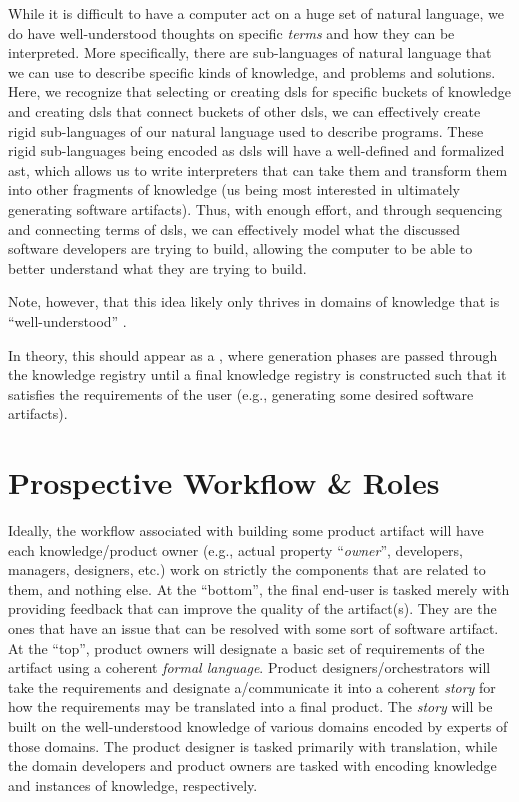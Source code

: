 While it is difficult to have a computer act on a huge set of natural language,
we do have well-understood thoughts on specific \textit{terms} and how they can
be interpreted. More specifically, there are sub-languages of natural language
that we can use to describe specific kinds of knowledge, and problems and
solutions. Here, we recognize that selecting or creating \aclp{dsl} for specific
buckets of knowledge and creating \aclp{dsl} that connect buckets of other
\aclp{dsl}, we can effectively create rigid sub-languages of our natural
language used to describe programs. These rigid sub-languages being encoded as
\aclp{dsl} will have a well-defined and formalized \acs{ast}, which allows us to
write interpreters that can take them and transform them into other fragments of
knowledge (us being most interested in ultimately generating software
artifacts). Thus, with enough effort, and through sequencing and connecting
terms of \aclp{dsl}, we can effectively model what the discussed software
developers are trying to build, allowing the computer to be able to better
understand what they are trying to build.

Note, however, that this idea likely only thrives in domains of knowledge that
is ``well-understood'' \cite{well-understood}.

In theory, this should appear as a , where generation phases are passed
through the knowledge registry until a final knowledge registry is constructed
such that it satisfies the requirements of the user (e.g., generating some
desired software artifacts).

\section{Prospective Workflow \& Roles}
\label{sec:idlgy:prospective_workflow}

Ideally, the workflow associated with building some product artifact will have
each knowledge/product owner (e.g., actual property ``\textit{owner}'',
developers, managers, designers, etc.) work on strictly the components that are
related to them, and nothing else. At the ``bottom'', the final end-user is
tasked merely with providing feedback that can improve the quality of the
artifact(s). They are the ones that have an issue that can be resolved with some
sort of software artifact. At the ``top'', product owners will designate a basic
set of requirements of the artifact using a coherent \textit{formal language}.
Product designers/orchestrators will take the requirements and designate
a/communicate it into a coherent \textit{story} for how the requirements may be
translated into a final product. The \textit{story} will be built on the
well-understood knowledge of various domains encoded by experts of those
domains. The product designer is tasked primarily with translation, while the
domain developers and product owners are tasked with encoding knowledge and
instances of knowledge, respectively.

